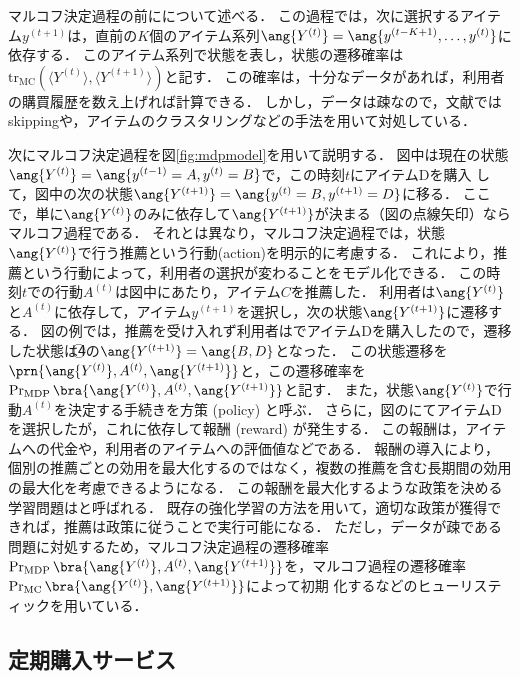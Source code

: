 マルコフ決定過程の前にについて述べる．
この過程では，次に選択するアイテム$y^{(t+1)}$は，直前の$K$個のアイテム系列$\ang{Y^{(t)}}=\ang{y^{(t-K+1)},\dotsc,y^{(t)}}$に依存する．
このアイテム系列で状態を表し，状態の遷移確率は$\mathrm{tr}_\mathrm{MC}(\langle Y^{(t)}\rangle,\langle Y^{(t+1)}\rangle)$と記す．
この確率は，十分なデータがあれば，利用者の購買履歴を数え上げれば計算できる．
しかし，データは疎なので，文献\cite{uai:02:02,jmlr:05:03}ではskippingや，アイテムのクラスタリングなどの手法を用いて対処している．

次にマルコフ決定過程を図\ref{fig:mdpmodel}を用いて説明する．
図中は現在の状態$\ang{Y^{(t)}}=\ang{y^{(t-1)}=A,y^{(t)}=B}$で，この時刻$t$にアイテムDを購入
して，図中の次の状態$\ang{Y^{(t+1)}}=\ang{y^{(t)}=B,y^{(t+1)}=D}$に移る．
ここで，単に$\ang{Y^{(t)}}$のみに依存して$\ang{Y^{(t+1)}}$が決まる（図の点線矢印）ならマルコフ過程である．
それとは異なり，マルコフ決定過程では，状態$\ang{Y^{(t)}}$で行う推薦という行動(action)を明示的に考慮する．
これにより，推薦という行動によって，利用者の選択が変わることをモデル化できる．
この時刻$t$での行動$A^{(t)}$は図中にあたり，アイテム$C$を推薦した．
利用者は$\ang{Y^{(t)}}$と$A^{(t)}$に依存して，アイテム$y^{(t+1)}$を選択し，次の状態$\ang{Y^{(t+1)}}$に遷移する．
図の例では，推薦を受け入れず利用者はでアイテムDを購入したので，遷移した状態は\textcircled{\small 4}の$\ang{Y^{(t+1)}}=\ang{B,D}$となった．
この状態遷移を$\prn{\ang{Y^{(t)}},A^{(t)},\ang{Y^{(t+1)}}}$と，この遷移確率を$\Pr_\mathrm{MDP}\bra{\ang{Y^{(t)}},A^{(t)},\ang{Y^{(t+1)}}}$と記す．
また，状態$\ang{Y^{(t)}}$で行動$A^{(t)}$を決定する手続きを方策 (policy) と呼ぶ．
さらに，図のにてアイテムDを選択したが，これに依存して報酬 (reward) が発生する．
この報酬は，アイテムへの代金や，利用者のアイテムへの評価値などである．
報酬の導入により，個別の推薦ごとの効用を最大化するのではなく，複数の推薦を含む長期間の効用の最大化を考慮できるようになる．
この報酬を最大化するような政策を決める学習問題は\cite{eb:058:00,j:0016}と呼ばれる．
既存の強化学習の方法を用いて，適切な政策が獲得できれば，推薦は政策に従うことで実行可能になる．
ただし，データが疎である問題に対処するため，マルコフ決定過程の遷移確率$\Pr_\mathrm{MDP}\bra{\ang{Y^{(t)}}, A^{(t)},\ang{Y^{(t+1)}}}$を，マルコフ過程の遷移確率$\Pr_\mathrm{MC}\bra{\ang{Y^{(t)}}, \ang{Y^{(t+1)}}}$によって初期
化するなどのヒューリスティックを用いている．

\subsection{定期購入サービス}

